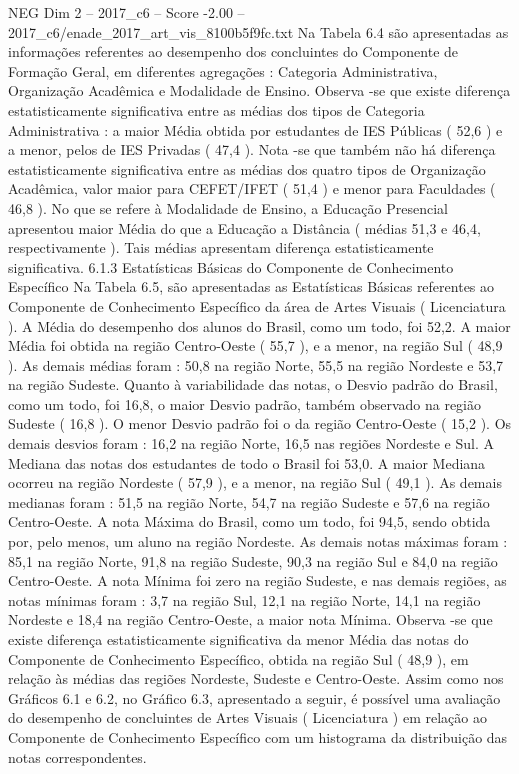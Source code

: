 \begin{textsample}{NEG Dim 2 – 2017\_c6 – Score -2.00 – 2017\_c6/enade\_2017\_art\_vis\_8100b5f9fc.txt}
Na Tabela 6.4 são apresentadas as informações referentes ao desempenho dos concluintes do Componente de Formação Geral, em diferentes agregações : Categoria Administrativa, Organização Acadêmica e Modalidade de Ensino.
Observa -se que existe diferença estatisticamente significativa entre as médias dos tipos de Categoria Administrativa : a maior Média obtida por estudantes de IES Públicas ( 52,6 ) e a menor, pelos de IES Privadas ( 47,4 ).
Nota -se que também não há diferença estatisticamente significativa entre as médias dos quatro tipos de Organização Acadêmica, valor maior para CEFET/IFET ( 51,4 ) e menor para Faculdades ( 46,8 ).
No que se refere à Modalidade de Ensino, a Educação Presencial apresentou maior Média do que a Educação a Distância ( médias 51,3 e 46,4, respectivamente ).
Tais médias apresentam diferença estatisticamente significativa. 6.1.3 Estatísticas Básicas do Componente de Conhecimento Específico Na Tabela 6.5, são apresentadas as Estatísticas Básicas referentes ao Componente de Conhecimento Específico da área de Artes Visuais ( Licenciatura ).
A Média do desempenho dos alunos do Brasil, como um todo, foi 52,2.
A maior Média foi obtida na região Centro-Oeste ( 55,7 ), e a menor, na região Sul ( 48,9 ).
As demais médias foram : 50,8 na região Norte, 55,5 na região Nordeste e 53,7 na região Sudeste.
Quanto à variabilidade das notas, o Desvio padrão do Brasil, como um todo, foi 16,8, o maior Desvio padrão, também observado na região Sudeste ( 16,8 ).
O menor Desvio padrão foi o da região Centro-Oeste ( 15,2 ).
Os demais desvios foram : 16,2 na região Norte, 16,5 nas regiões Nordeste e Sul.
A Mediana das notas dos estudantes de todo o Brasil foi 53,0.
A maior Mediana ocorreu na região Nordeste ( 57,9 ), e a menor, na região Sul ( 49,1 ).
As demais medianas foram : 51,5 na região Norte, 54,7 na região Sudeste e 57,6 na região Centro-Oeste.
A nota Máxima do Brasil, como um todo, foi 94,5, sendo obtida por, pelo menos, um aluno na região Nordeste.
As demais notas máximas foram : 85,1 na região Norte, 91,8 na região Sudeste, 90,3 na região Sul e 84,0 na região Centro-Oeste.
A nota Mínima foi zero na região Sudeste, e nas demais regiões, as notas mínimas foram : 3,7 na região Sul, 12,1 na região Norte, 14,1 na região Nordeste e 18,4 na região Centro-Oeste, a maior nota Mínima.
Observa -se que existe diferença estatisticamente significativa da menor Média das notas do Componente de Conhecimento Específico, obtida na região Sul ( 48,9 ), em relação às médias das regiões Nordeste, Sudeste e Centro-Oeste.
Assim como nos Gráficos 6.1 e 6.2, no Gráfico 6.3, apresentado a seguir, é possível uma avaliação do desempenho de concluintes de Artes Visuais ( Licenciatura ) em relação ao Componente de Conhecimento Específico com um histograma da distribuição das notas correspondentes.

\end{textsample}
